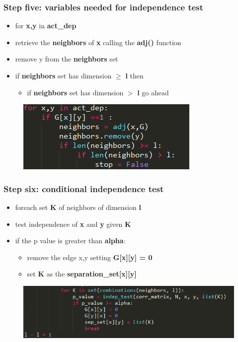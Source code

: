 \documentclass[xcolor ={table,usenames,dvipsnames}]{beamer}
\theoremstyle{definition}
\begin{document}
\begin{frame}
\frametitle{Step five: variables needed for independence test}
\begin{itemize}
	\item for \textbf{x,y} in \textbf{act\_dep}
	\item retrieve the \textbf{neighbors} of \textbf{x} calling the \textbf{adj()} function
	\item remove y from the \textbf{neighbors} set
	\item if \textbf{neighbors} set has dimension $\ge$ \textbf{l} then \begin{itemize}
	\item if \textbf{neighbors} set has dimension $>$ \textbf{l} go ahead
	\end{itemize}
\end{itemize}
	\begin{figure}[h!]
		\centering
		\includegraphics[scale=0.8]{img/indepvar.PNG}
	\end{figure}
\end{frame}
\begin{frame}
\frametitle{Step six: conditional independence test}
\begin{itemize}
	\item foreach set \textbf{K} of neighbors of dimension \textbf{l}
	\item test independence of \textbf{x} and \textbf{y} given \textbf{K}
	\item if the p value is greater than \textbf{alpha}:
	\begin{itemize}
		\item remove the edge x,y setting \textbf{G[x][y] = 0}
		\item set \textbf{K} as the \textbf{separation\_set[x][y]}
	\end{itemize}
\end{itemize}
	\begin{figure}[h!]
		\centering
		\includegraphics[scale=0.6]{img/indeptest.PNG}
		\label{Interfacce di un CS}
	\end{figure}
\end{frame}
\end{document}
